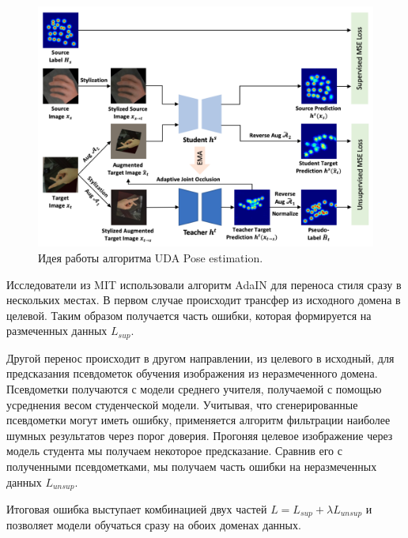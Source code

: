 \begin{figure}[h]
	\centering
	\includegraphics[width=\textwidth]{./images/UDA}
	\caption{Идея работы алгоритма UDA Pose estimation. \cite{uda}}
	\label{fig:uda}
\end{figure}

Исследователи из MIT использовали алгоритм AdaIN \cite{adain} для переноса стиля сразу в нескольких местах. В первом случае происходит трансфер из исходного домена в целевой. Таким образом получается часть ошибки, которая формируется на размеченных данных $L_{sup}$.

Другой перенос происходит в другом направлении, из целевого в исходный, для предсказания псевдометок обучения изображения из неразмеченного домена. Псевдометки получаются с модели среднего учителя, получаемой с помощью усреднения весом студенческой модели. Учитывая, что сгенерированные псевдометки могут иметь ошибку, применяется алгоритм фильтрации наиболее шумных результатов через порог доверия. Прогоняя целевое изображение через модель студента мы получаем некоторое предсказание. Сравнив его с полученными псевдометками, мы получаем часть ошибки на неразмеченных данных $L_{unsup}$.

Итоговая ошибка выступает комбинацией двух частей $L = L_{sup} + \lambda L_{unsup}$ и позволяет модели обучаться сразу на обоих доменах данных.


\newpage
